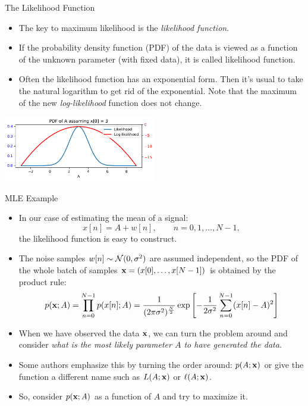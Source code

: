 \documentclass[10pt, aspectratio=169]{beamer} %
\newcommand{\x}{{\bf x}}
\begin{document}
\begin{frame}[allowframebreaks=0.8]{The Likelihood Function}
\begin{itemize}
\item The key to maximum likelihood is the \emph{likelihood function}.
\item If the probability density function (PDF) of the data is viewed as a function of the unknown 
parameter (with fixed data), it is called likelihood function.
\item Often the likelihood function has an exponential form. Then it's usual to
take the natural logarithm to get rid of the exponential. Note that the maximum of
the new \emph{log-likelihood} function does not change.
\end{itemize}
\centerline{\includegraphics[width=0.5\textwidth]{PDF_A_LL.pdf}}
\end{frame}

\begin{frame}[allowframebreaks=0.8]
{MLE Example}

\begin{itemize}
\item In our case of estimating the mean of a signal:
\[
x[n] = A + w[n],\qquad n=0,1,\ldots, N-1,
\]
the likelihood function is easy to construct.
\item The noise samples $w[n]\sim {\cal N}(0,\sigma^2)$ are assumed independent, so the PDF
of the whole batch of samples $\x = (x[0],\ldots, x[N-1])$ is obtained by the product rule:
\[
p({\x};A) = \prod_{n = 0}^{N-1} p(x[n]; A) = \frac{1}{(2 \pi \sigma^2)^{\frac{N}{2}}} \exp\left[-
  \frac{1}{2\sigma^2} \sum_{n=0}^{N-1} (x[n]-A)^2\right]
\]
\item When we have observed the data $\x$, we can turn the problem
  around and consider \emph{what is the most likely parameter $A$ to have
  generated the data}.
\item Some authors emphasize this by turning the order around:
  $p(A;\x)$ or give the function a different name such as $L(A; \x)$
  or $\ell(A;\x)$.
\item So, consider $p(\x;A)$ as a function of $A$ and try to maximize
  it.
\end{itemize}
\end{frame}
\end{document}
